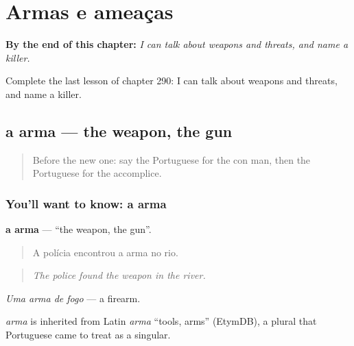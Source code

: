 
\chapter{Armas e ameaças}
\label{ch:pt-armas-e-ameacas}

\begin{chapteropening}
\textbf{By the end of this chapter:} \emph{I can talk about weapons and threats, and name a killer.}

Complete the last lesson of chapter 290: I can talk about weapons and threats, and name a killer.
\end{chapteropening}

\section[a arma]{a arma — the weapon, the gun}

\label{lesson:PT-C290-arma}



\begin{quote}
Before the new one: say the Portuguese for the con man, then the Portuguese for the accomplice.
\end{quote}

\subsection*{You'll want to know: a arma}
\textbf{a arma} — \textquotedblleft{}the weapon, the gun\textquotedblright{}.

\begin{quote}
A polícia encontrou a arma no rio.
\end{quote}

\begin{quote}
\emph{The police found the weapon in the river.}
\end{quote}

\emph{Uma arma de fogo} — a firearm.

\begin{cousinweb}
\emph{arma} is inherited from Latin \emph{arma} \textquotedblleft{}tools, arms\textquotedblright{} (EtymDB), a plural that Portuguese came to treat as a singular.
\end{cousinweb}

